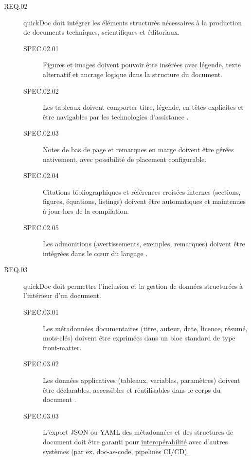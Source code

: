 \documentclass[a4paper,12pt]{article}
\begin{document}
\begin{description}
\item[{\label{orga1936fc}REQ.02}] quickDoc doit intégrer les éléments structurés nécessaires à la production de documents techniques, scientifiques et éditoriaux.
\begin{description}
\item[{\label{orgbf61eb8}SPEC.02.01}] Figures et images doivent pouvoir être insérées avec légende, texte alternatif et ancrage logique dans la structure du document.
\item[{\label{org1aab081}SPEC.02.02}] Les tableaux doivent comporter titre, légende, en-têtes explicites et être navigables par les technologies d’assistance \autocite{goodgerReStructuredTextMarkupSpecification2025}.
\item[{\label{orgd0c441b}SPEC.02.03}] Notes de bas de page et remarques en marge doivent être gérées nativement, avec possibilité de placement configurable.
\item[{\label{org1a942e9}SPEC.02.04}] Citations bibliographiques et références croisées internes (sections, figures, équations, listings) doivent être automatiques et maintenues à jour lors de la compilation.
\item[{\label{orge9f50b3}SPEC.02.05}] Les admonitions (avertissements, exemples, remarques) doivent être intégrées dans le cœur du langage \autocite{donathAdmonitionsMaterialMkDocs}.
\end{description}

\item[{\label{orgcc38ed7}REQ.03}] quickDoc doit permettre l’inclusion et la gestion de données structurées à l’intérieur d’un document.
\begin{description}
\item[{\label{orgf30a18e}SPEC.03.01}] Les métadonnées documentaires (titre, auteur, date, licence, résumé, mots-clés) doivent être exprimées dans un bloc standard de type front-matter.
\item[{\label{orgb797f6e}SPEC.03.02}] Les données applicatives (tableaux, variables, paramètres) doivent être déclarables, accessibles et réutilisables dans le corps du document \autocite{johnmacfarlanePandocUsersGuide2025}.
\item[{\label{org62ad5cc}SPEC.03.03}] L’export JSON ou YAML des métadonnées et des structures de document doit être garanti pour \protect\hyperlink{gls-1}{\label{gls-1-use-3}interopérabilité} avec d’autres systèmes (par ex. doc-as-code, pipelines CI/CD).
\end{description}


\end{description}
\end{document}
